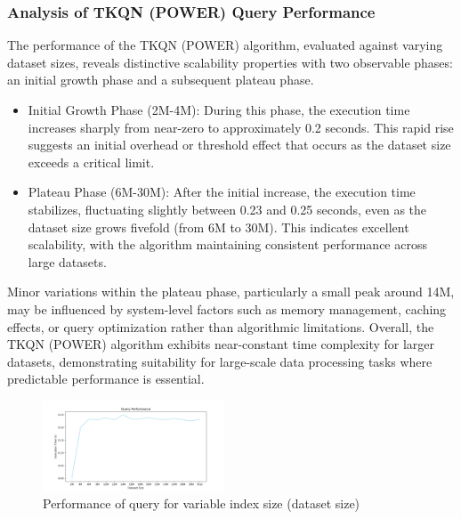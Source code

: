 \documentclass[conference]{IEEEtran}
\begin{document}
\subsubsection{Analysis of TKQN (POWER) Query Performance}
The performance of the TKQN (POWER) algorithm, evaluated against varying dataset sizes, reveals distinctive scalability properties with two observable phases: an initial growth phase and a subsequent plateau phase.
\begin{itemize}
    \item Initial Growth Phase (2M-4M): During this phase, the execution time increases sharply from near-zero to approximately 0.2 seconds. This rapid rise suggests an initial overhead or threshold effect that occurs as the dataset size exceeds a critical limit.
    \item Plateau Phase (6M-30M): After the initial increase, the execution time stabilizes, fluctuating slightly between 0.23 and 0.25 seconds, even as the dataset size grows fivefold (from 6M to 30M). This indicates excellent scalability, with the algorithm maintaining consistent performance across large datasets.
\end{itemize}
Minor variations within the plateau phase, particularly a small peak around 14M, may be influenced by system-level factors such as memory management, caching effects, or query optimization rather than algorithmic limitations.
Overall, the TKQN (POWER) algorithm exhibits near-constant time complexity for larger datasets, demonstrating suitability for large-scale data processing tasks where predictable performance is essential.
\begin{figure}[htbp]
    \centering
    \includegraphics[width=0.48\textwidth]{Project_Figure_2.png}
    \caption{Performance of query for variable index size (dataset size)}
    \label{fig:2}
\end{figure}
\end{document}
